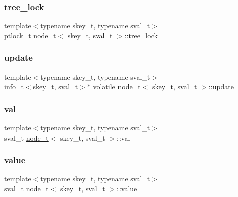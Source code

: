 \mbox{\label{structnode__t_a172896833cd7a9331b2afabc55c1914a}} 
\subsubsection{\texorpdfstring{tree\+\_\+lock}{tree\_lock}}
{\footnotesize\ttfamily template$<$typename skey\+\_\+t, typename sval\+\_\+t$>$ \\
\hyperlink{ccavl__impl_8h_a61cf36cb33c84af9c784f95686701a94}{ptlock\+\_\+t} \hyperlink{structnode__t}{node\+\_\+t}$<$ skey\+\_\+t, sval\+\_\+t $>$\+::tree\+\_\+lock}

\mbox{\label{structnode__t_a3009fd14ae83f7f3a307450005261482}} 
\subsubsection{\texorpdfstring{update}{update}}
{\footnotesize\ttfamily template$<$typename skey\+\_\+t, typename sval\+\_\+t$>$ \\
\hyperlink{unioninfo__t}{info\+\_\+t}$<$skey\+\_\+t, sval\+\_\+t$>$$\ast$ volatile \hyperlink{structnode__t}{node\+\_\+t}$<$ skey\+\_\+t, sval\+\_\+t $>$\+::update}

\mbox{\label{structnode__t_aca6e214f7ceac5575365b70fbf2a6693}} 
\subsubsection{\texorpdfstring{val}{val}}
{\footnotesize\ttfamily template$<$typename skey\+\_\+t, typename sval\+\_\+t$>$ \\
sval\+\_\+t \hyperlink{structnode__t}{node\+\_\+t}$<$ skey\+\_\+t, sval\+\_\+t $>$\+::val}

\mbox{\label{structnode__t_afa5c26cdc749c26fcbc550baf6e97717}} 
\subsubsection{\texorpdfstring{value}{value}}
{\footnotesize\ttfamily template$<$typename skey\+\_\+t, typename sval\+\_\+t$>$ \\
sval\+\_\+t \hyperlink{structnode__t}{node\+\_\+t}$<$ skey\+\_\+t, sval\+\_\+t $>$\+::value}



